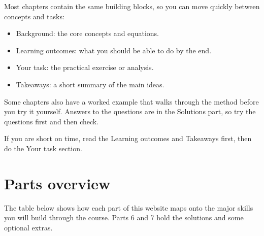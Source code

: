 \documentclass[
  a4paper]{book}
\providecommand{\tightlist}{%
  \setlength{\itemsep}{0pt}\setlength{\parskip}{0pt}}
\begin{document}
Most chapters contain the same building blocks, so you can move quickly between concepts and tasks:

\begin{itemize}
\tightlist
\item
  Background: the core concepts and equations.
\item
  Learning outcomes: what you should be able to do by the end.
\item
  Your task: the practical exercise or analysis.
\item
  Takeaways: a short summary of the main ideas.
\end{itemize}

Some chapters also have a worked example that walks through the method before you try it yourself. Answers to the questions are in the Solutions part, so try the questions first and then check.

If you are short on time, read the Learning outcomes and Takeaways first, then do the Your task section.

\section{Parts overview}\label{parts-overview}

The table below shows how each part of this website maps onto the major skills you will build through the course. Parts 6 and 7 hold the solutions and some optional extras.
\end{document}
